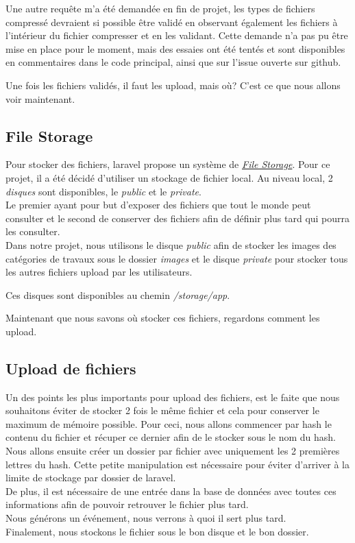 \documentclass[
    iai, %
    il, %
]{heig-tb}
\begin{document}
Une autre requête m'a été demandée en fin de projet, les types de fichiers compressé devraient si possible être validé en observant également les fichiers à l'intérieur du fichier compresser et en les validant. Cette demande n'a pas pu être mise en place pour le moment, mais des essaies ont été tentés et sont disponibles en commentaires dans le code principal, ainsi que sur l'issue ouverte sur \Gls{github}.

Une fois les fichiers validés, il faut les upload, mais où? C'est ce que nous allons voir maintenant.

\subsection{File Storage}
Pour stocker des fichiers, \Gls{laravel} propose un système de \href{https://laravel.com/docs/9.x/filesystem}{\emph{File Storage}}. Pour ce projet, il a été décidé d'utiliser un stockage de fichier local. Au niveau local, 2 \emph{disques} sont disponibles, le \emph{public} et le \emph{private}. \\
Le premier ayant pour but d'exposer des fichiers que tout le monde peut consulter et le second de conserver des fichiers afin de définir plus tard qui pourra les consulter. \\

Dans notre projet, nous utilisons le disque \emph{public} afin de stocker les images des catégories de travaux sous le dossier \emph{images} et le disque \emph{private} pour stocker tous les autres fichiers upload par les utilisateurs.

Ces disques sont disponibles au chemin \emph{/storage/app}.

Maintenant que nous savons où stocker ces fichiers, regardons comment les upload.

\subsection{Upload de fichiers}
Un des points les plus importants pour upload des fichiers, est le faite que nous souhaitons éviter de stocker 2 fois le même fichier et cela pour conserver le maximum de mémoire possible. Pour ceci, nous allons commencer par \Gls{hash} le contenu du fichier et récuper ce dernier afin de le stocker sous le nom du \Gls{hash}. \\
Nous allons ensuite créer un dossier par fichier avec uniquement les 2 premières lettres du \Gls{hash}. Cette petite manipulation est nécessaire pour éviter d'arriver à la limite de stockage par dossier de \Gls{laravel}. \\
De plus, il est nécessaire de une entrée dans la base de données avec toutes ces informations afin de pouvoir retrouver le fichier plus tard. \\
Nous générons un événement, nous verrons à quoi il sert plus tard. \\
Finalement, nous stockons le fichier sous le bon disque et le bon dossier.
\end{document}
